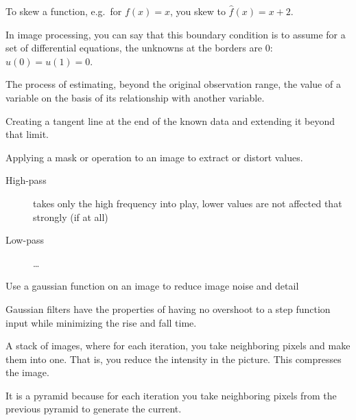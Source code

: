 \begin{definition}
    To skew a function, e.g.\ for $f(x) = x$, you skew to $\hat{f}(x) = x + 2$.
\end{definition}

\begin{definition}
    In image processing, you can say that this boundary condition is to assume
    for a set of differential equations, the unknowns at the borders are 
    0: $u(0) = u(1) = 0$.

\end{definition}

\begin{definition}[extrapolation]
    The process of estimating, beyond the original observation range, the value
    of a variable on the basis of its relationship with another variable.

    Creating a tangent line at the end of the known data and extending it
    beyond that limit.

\end{definition}

\begin{definition}[Filter]
    Applying a mask or operation to an image to extract or distort values.

    \begin{description}
        \item[High-pass] takes only the high frequency into play, lower values
            are not affected that strongly (if at all)
        \item[Low-pass] \dots
    \end{description}
\end{definition}

\begin{definition}
    Use a gaussian function on an image to reduce image noise and detail
\end{definition}

\begin{definition}
    Gaussian filters have the properties of having no overshoot to a step
    function input while minimizing the rise and fall time.

\end{definition}

\begin{definition}
    A stack of images, where for each iteration, you take neighboring pixels
    and make them into one. That is, you reduce the intensity in the picture.
    This compresses the image. 

    It is a pyramid because for each iteration you take neighboring pixels
    from the previous pyramid to generate the current.
\end{definition}


